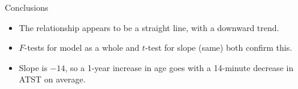\documentclass{beamer}
\begin{document}
\begin{frame}{Conclusions}

    \begin{itemize}
  \item The relationship appears to be a straight line, with a downward trend.
  \item $F$-tests for model as a whole and $t$-test for slope (same) both confirm this.
  \item Slope is $-14$, so a 1-year increase in age goes with a 14-minute decrease in ATST on average.
  \end{itemize}
  
\end{frame}

% 
% 
% 

\end{document}

